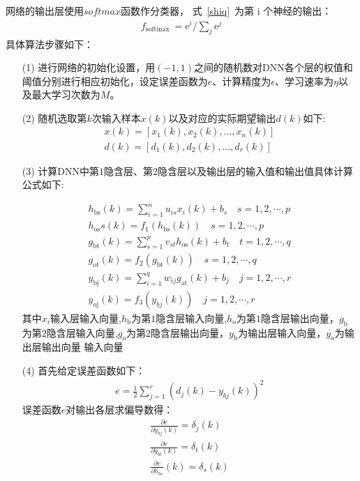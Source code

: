 \documentclass{whutmod}
\begin{document}
	网络的输出层使用$ softmax $函数作分类器， 式~\ref{shiq}~为第 i 个神经的输出：
	\begin{gather}\label{shiq}
		f_{\text {softinax }}=\mathrm{e}^{i} / \sum_{j} \mathrm{e}^{j}
	\end{gather}
	具体算法步骤如下：
	\begin{itemize}
	\item [(1)]进行网络的初始化设置，用$(-1,1)$之间的随机数对DNN各个层的权值和阈值分别进行相应初始化，设定误差函数为$e$、计算精度为$\epsilon $、学习速率为$\eta $以及最大学习次数为$M$。

	\item [(2)]随机选取第$k$次输入样本$x(k)$以及对应的实际期望输出$d(k)$如下:
	\begin{gather*}
	x(k)=[x_{1}(k),x_{2}(k),...,x_{n}(k)]\\
	d(k)=[d_{1}(k),d_{2}(k),...,d_{r}(k)]
	\end{gather*}
	
	\item [(3)]计算DNN中第$1$隐含层、第$2$隐含层以及输出层的输入值和输出值具体计算公式如下:

	\begin{gather*}
	h_{\mathrm{bs}} (k)=\sum_{i=1}^{n} u_{i s} x_{i}(k)+b_{s} \quad s=1,2, \cdots,p\\
	h_{\mathrm{os}} s(k)=f_{1}\left(h_{\mathrm{bs}}(k)\right) \quad s=1,2, \cdots, p	\\
    g_{\mathrm{bt}}(k)=\sum_{s=1}^{p} v_{s t} h_{\mathrm{os}}(k)+b_{t} \quad t=1,2, \cdots, q\\
   	g_{\mathrm{ot}}(k)=f_{2}\left(g_{\mathrm{bt}}(k)\right) \quad s=1,2, \cdots, q	\\
   	y_{\mathrm{bj}}( k )=\sum_{i = 1 }^{q}w_{ij}g_{\mathrm{at}}(k)+b_{j} \quad j = 1,2 , \cdots,r\\
   y_{\mathrm{oj}}( k ) = f _ { 3 } \left( y _ { b j } ( k ) \right) \quad j = 1,2 , \cdots,r
	\end{gather*}
	其中$x_{i}$输入层输入向量,$h_{\mathrm{b}}$为第$1$隐含层输入向量,$h_{\mathrm{o}}$为第$1$隐含层输出向量，$g_{\mathrm{b}}$为第$2$隐含层输入向量,$g_{\mathrm{o}}$为第$2$隐含层输出向量，$y_{\mathrm{b}}$为输出层输入向量，$y_{\mathrm{o}}$为输出层输出向量
	输入向量
	\item [(4)]首先给定误差函数如下：
	\begin{gather*}
	e = \frac { 1 } { 2 } \sum _ { j = 1 } ^ { r } \left( d _ { j } ( k ) - y _ { bj } ( k ) \right) ^ { 2 }
	\end{gather*}
	误差函数$e$对输出各层求偏导数得：
		\begin{gather*}
        \frac { \partial e } { \partial y _ { b j}(k) }=\delta _{j}(k)\\
        \frac { \partial e } { \partial g _ { bt }(k) }=\delta _{t}(k)\\
        \frac { \partial e } { \partial h _ { bs} }(k)=\delta _{s}(k)
        \end{gather*}


\end{itemize}
\end{document}

